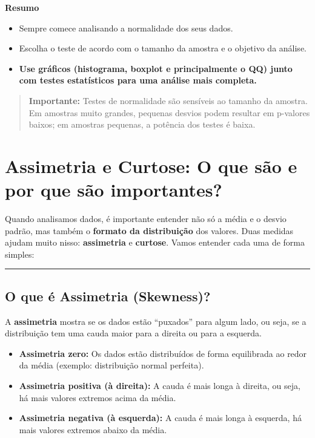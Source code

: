 \documentclass[
]{book}
\providecommand{\tightlist}{%
  \setlength{\itemsep}{0pt}\setlength{\parskip}{0pt}}
\begin{document}
\textbf{Resumo}

\begin{itemize}
\tightlist
\item
  Sempre comece analisando a normalidade dos seus dados.
\item
  Escolha o teste de acordo com o tamanho da amostra e o objetivo da análise.
\item
  \textbf{Use gráficos (histograma, boxplot e principalmente o QQ) junto com testes estatísticos para uma análise mais completa.}
\end{itemize}

\begin{quote}
\textbf{Importante:} Testes de normalidade são sensíveis ao tamanho da amostra. Em amostras muito grandes, pequenas desvios podem resultar em p-valores baixos; em amostras pequenas, a potência dos testes é baixa.
\end{quote}

\section{Assimetria e Curtose: O que são e por que são importantes?}\label{assimetria-e-curtose-o-que-suxe3o-e-por-que-suxe3o-importantes}

Quando analisamos dados, é importante entender não só a média e o desvio padrão, mas também o \textbf{formato da distribuição} dos valores. Duas medidas ajudam muito nisso: \textbf{assimetria} e \textbf{curtose}. Vamos entender cada uma de forma simples:

\begin{center}\rule{0.5\linewidth}{0.5pt}\end{center}

\subsection{O que é Assimetria (Skewness)?}\label{o-que-uxe9-assimetria-skewness}

A \textbf{assimetria} mostra se os dados estão ``puxados'' para algum lado, ou seja, se a distribuição tem uma cauda maior para a direita ou para a esquerda.

\begin{itemize}
\tightlist
\item
  \textbf{Assimetria zero:} Os dados estão distribuídos de forma equilibrada ao redor da média (exemplo: distribuição normal perfeita).
\item
  \textbf{Assimetria positiva (à direita):} A cauda é mais longa à direita, ou seja, há mais valores extremos acima da média.
\item
  \textbf{Assimetria negativa (à esquerda):} A cauda é mais longa à esquerda, há mais valores extremos abaixo da média.
\end{itemize}
\end{document}
